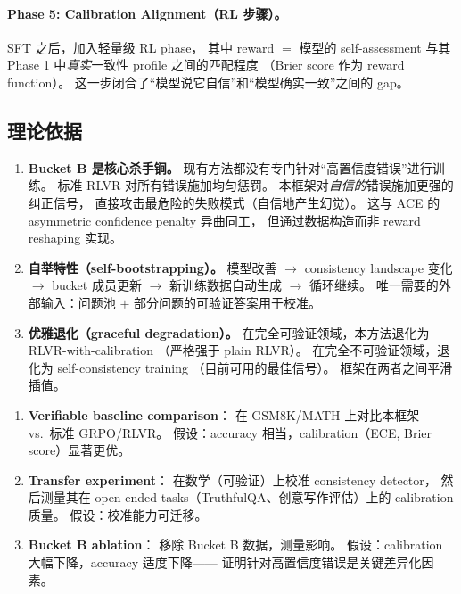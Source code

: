 \documentclass[12pt,a4paper]{article}
\begin{document}
\paragraph{Phase 5: Calibration Alignment（RL 步骤）。}
SFT 之后，加入轻量级 RL phase，
其中 reward $=$ 模型的 self-assessment 与其
Phase 1 中\textit{真实}一致性 profile 之间的匹配程度
（Brier score 作为 reward function）。
这一步闭合了``模型说它自信''和``模型确实一致''之间的 gap。

\subsection{理论依据}

\begin{enumerate}[leftmargin=2em]
  \item \textbf{Bucket B 是核心杀手锏。}
    现有方法都没有专门针对``高置信度错误''进行训练。
    标准 RLVR 对所有错误施加均匀惩罚。
    本框架对\textit{自信的}错误施加更强的纠正信号，
    直接攻击最危险的失败模式（自信地产生幻觉）。
    这与 ACE 的 asymmetric confidence penalty 异曲同工，
    但通过数据构造而非 reward reshaping 实现。

  \item \textbf{自举特性（self-bootstrapping）。}
    模型改善 $\rightarrow$ consistency landscape 变化
    $\rightarrow$ bucket 成员更新 $\rightarrow$ 新训练数据自动生成
    $\rightarrow$ 循环继续。
    唯一需要的外部输入：问题池 $+$ 部分问题的可验证答案用于校准。

  \item \textbf{优雅退化（graceful degradation）。}
    在完全可验证领域，本方法退化为 RLVR-with-calibration
    （严格强于 plain RLVR）。
    在完全不可验证领域，退化为 self-consistency training
    （目前可用的最佳信号）。
    框架在两者之间平滑插值。
\end{enumerate}

\begin{expbox}
\begin{enumerate}[leftmargin=1.5em]
  \item \textbf{Verifiable baseline comparison}：
    在 GSM8K/MATH 上对比本框架 vs.\ 标准 GRPO/RLVR。
    假设：accuracy 相当，calibration（ECE, Brier score）显著更优。

  \item \textbf{Transfer experiment}：
    在数学（可验证）上校准 consistency detector，
    然后测量其在 open-ended tasks（TruthfulQA、创意写作评估）上的
    calibration 质量。
    假设：校准能力可迁移。

  \item \textbf{Bucket B ablation}：
    移除 Bucket B 数据，测量影响。
    假设：calibration 大幅下降，accuracy 适度下降——
    证明针对高置信度错误是关键差异化因素。
\end{enumerate}
\end{expbox}
\end{document}
